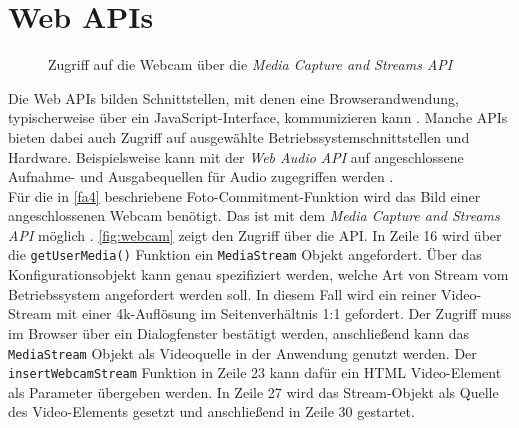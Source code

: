 \section{Web APIs}
\label{sec:web-apis}

\begin{figure}
  
  \caption{Zugriff auf die Webcam über die \emph{Media Capture and Streams API}}
  \label{fig:webcam}
\end{figure}

Die Web APIs bilden Schnittstellen, mit denen eine Browserandwendung, typischerweise über ein JavaScript-Interface,
kommunizieren kann \cite{web-apis}. Manche APIs bieten dabei auch Zugriff auf ausgewählte 
Betriebssystemschnittstellen und Hardware. Beispielsweise kann mit der \emph{Web Audio API} auf 
angeschlossene Aufnahme- und Ausgabequellen für Audio zugegriffen werden \cite{web-audio-api}.\\
Für die in \ref{fa4} beschriebene
Foto-Commitment-Funktion wird das Bild einer angeschlossenen Webcam benötigt. Das ist mit dem \emph{Media Capture and 
Streams API} möglich \cite{media-stream}. \autoref{fig:webcam} zeigt den Zugriff über die API. In Zeile 16 wird 
über die \texttt{getUserMedia()} Funktion ein \texttt{MediaStream} Objekt angefordert. Über das Konfigurationsobjekt
kann genau spezifiziert werden, welche Art von Stream vom Betriebssystem angefordert werden soll. In diesem Fall
wird ein reiner Video-Stream mit einer 4k-Auflösung im Seitenverhältnis 1:1 gefordert. Der Zugriff muss 
im Browser über ein Dialogfenster bestätigt werden, anschließend kann das \texttt{MediaStream} Objekt als
Videoquelle in der Anwendung genutzt werden. Der \texttt{insertWebcamStream} Funktion in Zeile 23 kann dafür
ein HTML Video-Element als Parameter übergeben werden. In Zeile 27 wird das Stream-Objekt als Quelle
des Video-Elements gesetzt und anschließend in Zeile 30 gestartet.

\iffalse
- Web USB
- 
\fi